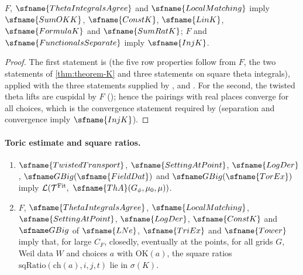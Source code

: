 \begin{lemma}\label{pf:fit:rows}
$F$, $\sfname{ThetaIntegralsAgree}$ and $\sfname{LocalMatching}$ imply $\sfname{SumOKK}$, $\sfname{ConstK}$, $\sfname{LinK}$,
$\sfname{FormulaK}$ and $\sfname{SumRatK}$; $F$ and $\sfname{FunctionalsSeparate}$ imply $\sfname{InjK}$.
\end{lemma}

\begin{proof}
The first statement is  (the five row properties follow
from $F$, the two statements of \cref{thm:theorem-K} and three statements on square theta integrals), applied with the three
statements supplied by ,
 and . For
the second, the twisted theta lifts are cuspidal by $F$ (); hence the
pairings with real places converge for all choices, which is the convergence statement required by
 (separation and convergence imply $\sfname{InjK}$).
\end{proof}

\paragraph{Toric estimate and square ratios.}
\begin{lemma}\label{pf:fit:toric}
\begin{enumerate}[label=(\alph*)]
\item $\sfname{TwistedTransport}$, $\sfname{SettingAtPoint}$, $\sfname{LogDer}$, $\fitGBig(\sfname{FieldDat})$ and
$\fitGBig(\sfname{TorEx})$ imply $\mathcal L(\mathcal T^{\fitFit},\ \sfname{ThA}(G_\phi,\mu_0,\mu))$.
\item $F$, $\sfname{ThetaIntegralsAgree}$, $\sfname{LocalMatching}$, $\sfname{SettingAtPoint}$, $\sfname{LogDer}$,
$\sfname{ConstK}$ and $\fitGBig$ of $\sfname{LNe}$, $\sfname{TriEx}$ and $\sfname{Tower}$ imply that, for large $C_F$,
closedly, eventually at the points, for all grids $G$, Weil data $W$ and choices $a$ with $\mathrm{OK}(a)$, the square ratios
$\mathrm{sqRatio}(\mathrm{ch}(a),i,j,t)$ lie in $\sigma(K)$.
\end{enumerate}
\end{lemma}


